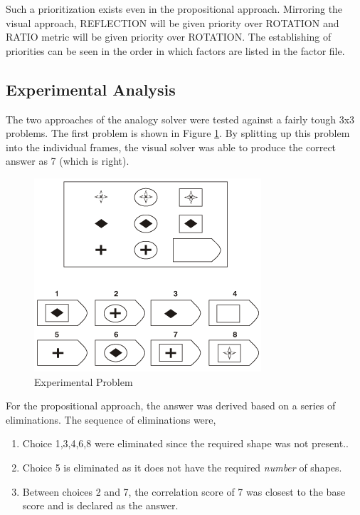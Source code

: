 \documentclass[10pt, letter]{article}
\begin{document}
Such a prioritization exists even in the propositional approach. Mirroring the visual approach, REFLECTION will be given priority over ROTATION and RATIO metric will be given priority over ROTATION. The establishing of priorities can be seen in the order in which factors are listed in the factor file.

\subsection*{Experimental Analysis}
The two approaches of the analogy solver were tested against a fairly tough 3x3 problems. The first problem is shown in Figure \ref{exp1}. By splitting up this problem into the individual frames, the visual solver was able to produce the correct answer as 7 (which is right). 
\begin{figure}[h!]
  \centering
    \includegraphics[scale = 0.45]{Images/Exp1}
    \caption{Experimental Problem}
  \label{exp1}
\end{figure}

For the propositional approach, the answer was derived based on a series of eliminations. The sequence of eliminations were,
\begin{enumerate}
	\item Choice 1,3,4,6,8 were eliminated since the required shape was not present..
	\item Choice 5 is eliminated as it does not have the required \textit{number} of shapes.
	\item Between choices 2 and 7, the correlation score of 7 was closest to the base score and is declared as the answer.
\end{enumerate}
\end{document}
